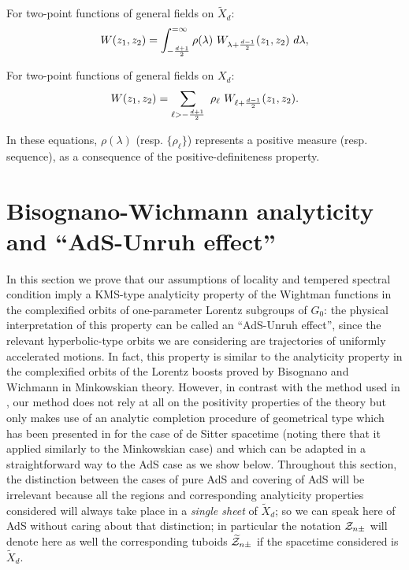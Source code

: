 \documentclass[a4paper,a4paper]{article}
\let\UnmodifSec=\section
\renewcommand{\section}{\setcounter{equation}{0}\UnmodifSec}
\def\ZZ{{\cal Z}}
\def\wt{\widetilde}
\begin{document}
\vskip 0.2cm
For two-point functions of general fields on $\wt X_d$:
\begin{equation}
W(z_1,z_2) = \int_{-{d+1\over 2}}^{=\infty} \rho(\lambda)
\ W_{\lambda + \frac{d-1}{2}}(z_1,z_2)\  d\lambda,
\end{equation}

For two-point functions of general fields on $X_d$:
\begin{equation}
W(z_1,z_2) = \sum_{\ell > -{d+1\over 2}}\ \rho_{\ell}
\ W_{\ell + \frac{d-1}{2}}(z_1,z_2).
\end{equation}

In these equations, $\rho(\lambda)$ (resp. $\{\rho_{\ell}\}$) represents
a positive measure (resp. sequence), as a consequence of the
positive-definiteness property.

\section{Bisognano-Wichmann analyticity and ``AdS-Unruh effect''}

\label{BWA}
In this section we prove that our assumptions of locality
and tempered spectral condition imply
a KMS-type analyticity property
of the Wightman functions in the complexified orbits of
one-parameter Lorentz subgroups of
$G_0$: the physical interpretation of this
property can be called
an ``AdS-Unruh effect'', since the relevant
hyperbolic-type orbits we are considering are
trajectories of uniformly accelerated motions.
In fact, this property is similar to the
analyticity property  in the complexified orbits
of the Lorentz boosts proved by Bisognano
and Wichmann \cite{BW} in Minkowskian theory.
However, in contrast with the method used in \cite{BW},
our method does not rely at all on the positivity properties
of the theory but only makes use of an analytic completion procedure of
geometrical type which has been presented in \cite{BEM}
for the case of de Sitter spacetime (noting there that it applied
similarly to the Minkowskian case) and which can be adapted in a
straightforward way to the AdS case as we show below.
Throughout this section, the distinction between the cases of pure AdS
and covering of AdS will be irrelevant because all the regions
and corresponding analyticity properties considered
will always take place in a {\sl single sheet} of $\wt X_d$; so
we can speak here of AdS
without caring about that distinction;
in particular the notation $\ZZ_{n\pm}$ will denote here as well
the corresponding tuboids
$\wt \ZZ_{n\pm}$ if the spacetime considered is $\wt X_d$.
\end{document}
